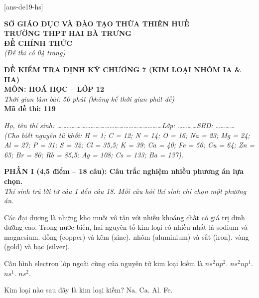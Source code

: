 \documentclass[11pt,a4paper]{article}
\def\loigiai#1{}
\begin{document}
[ans-de19-hs]

\noindent
\begin{minipage}[t]{0.48\textwidth}
	\textbf{SỞ GIÁO DỤC VÀ ĐÀO TẠO THỪA THIÊN HUẾ}\\
	\textbf{TRƯỜNG THPT HAI BÀ TRƯNG}\\
	\textbf{ĐỀ CHÍNH THỨC}\\
	\textit{(Đề thi có 04 trang)}
\end{minipage}\hfill
\begin{minipage}[t]{0.48\textwidth}
	\raggedleft
	\textbf{\color{mainGreen}ĐỀ KIỂM TRA ĐỊNH KỲ CHƯƠNG 7 (KIM LOẠI NHÓM IA \& IIA)}\\
	\textbf{MÔN: HOÁ HỌC -- LỚP 12}\\
	\textit{Thời gian làm bài: 50 phút (không kể thời gian phát đề)}\\
	\textbf{Mã đề thi: 119}
\end{minipage}


\vspace{1pt}
\noindent\textit{Họ, tên thí sinh: \dots\dots\dots\dots\dots\dots\dots\dots\dots\dots\dots\dots\dots\dots\dots\dots\dots\dots\dots\dots\dots\dots Lớp: \dots\dots\dots\dots SBD: \dots\dots\dots\dots}\\
\noindent\textit{(Cho biết nguyên tử khối: H = 1; C = 12; N = 14; O = 16; Na = 23; Mg = 24; Al = 27; P = 31; S = 32; Cl = 35,5; K = 39; Ca = 40; Fe = 56; Cu = 64; Zn = 65; Br = 80; Rb = 85,5; Ag = 108; Cs = 133; Ba = 137).}

\vspace{1pt}
\noindent
\textbf{PHẦN I (4,5 điểm -- 18 câu): Câu trắc nghiệm nhiều phương án lựa chọn.}\\
\textit{Thí sinh trả lời từ câu 1 đến câu 18. Mỗi câu hỏi thí sinh chỉ chọn một phương án.}

\begin{ex}
Các đại dương là những kho muối vô tận với nhiều khoáng chất có giá trị dinh dưỡng cao. Trong nước biển, hai nguyên tố kim loại có nhiều nhất là
\choice
{sodium và magnesium.}
{đồng (copper) và kẽm (zinc).}
{nhôm (aluminium) và sắt (iron).}
{vàng (gold) và bạc (silver).}
\loigiai{}
\end{ex}

\begin{ex}
Cấu hình electron lớp ngoài cùng của nguyên tử kim loại kiềm là
\choice
{$ns^2np^2$.}
{$ns^2np^1$.}
{$ns^1$.}
{$ns^2$.}
\loigiai{}
\end{ex}

\begin{ex}
Kim loại nào sau đây là kim loại kiềm?
\choice
{Na.}
{Ca.}
{Al.}
{Fe.}
\loigiai{}
\end{ex}
\end{document}
